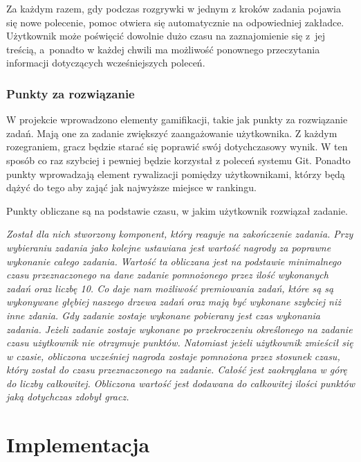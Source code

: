 \documentclass[11pt,a4paper,polish,thesis]{dcsbook}
\begin{document}
	Za każdym razem, gdy podczas rozgrywki w jednym z kroków zadania pojawia się nowe polecenie, pomoc otwiera się automatycznie na odpowiedniej zakładce. Użytkownik może poświęcić dowolnie dużo czasu na zaznajomienie się z~jej treścią, a~ponadto w każdej chwili ma możliwość ponownego przeczytania informacji dotyczących wcześniejszych poleceń.  
	
	\subsection{Punkty za rozwiązanie}

	W projekcie wprowadzono elementy gamifikacji, takie jak punkty za rozwiązanie zadań. Mają one za zadanie zwiększyć zaangażowanie użytkownika. Z każdym rozegraniem, gracz będzie starać się poprawić swój dotychczasowy wynik. W ten sposób co raz szybciej i pewniej będzie korzystał z poleceń systemu Git. Ponadto punkty wprowadzają element rywalizacji pomiędzy użytkownikami, którzy będą dążyć do tego aby zająć jak najwyższe miejsce w rankingu. 
	
	Punkty obliczane są na podstawie czasu, w jakim użytkownik rozwiązał zadanie. 
	
	
	\textit{	Został dla nich stworzony komponent, który reaguje na zakończenie zadania. Przy wybieraniu zadania jako kolejne ustawiana jest wartość nagrody za poprawne wykonanie całego zadania. Wartość ta obliczana jest na podstawie minimalnego czasu przeznaczonego na dane zadanie pomnożonego przez ilość wykonanych zadań oraz liczbę 10. Co daje nam możliwość premiowania zadań, które są są wykonywane głębiej naszego drzewa zadań oraz mają być wykonane szybciej niż inne zdania. Gdy zadanie zostaje wykonane pobierany jest czas wykonania zadania. Jeżeli zadanie zostaje wykonane po przekroczeniu określonego na zadanie czasu użytkownik nie otrzymuje punktów. Natomiast jeżeli użytkownik zmieścił się w czasie, obliczona wcześniej nagroda zostaje pomnożona przez stosunek czasu, który został do czasu przeznaczonego na zadanie. Całość jest zaokrąglana w górę do liczby całkowitej. Obliczona wartość jest dodawana do całkowitej ilości punktów jaką dotychczas zdobył gracz. }
	
	\chapter{Implementacja}
	
\end{document}
